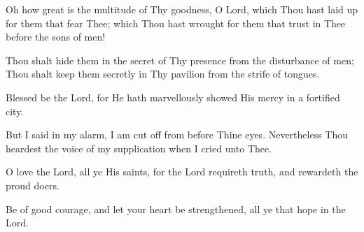 Oh how great is the multitude of Thy goodness, O Lord, which Thou hast laid up for them that fear Thee; which Thou hast wrought for them that trust in Thee before the sons of men!

Thou shalt hide them in the secret of Thy presence from the disturbance of men; Thou shalt keep them secretly in Thy pavilion from the strife of tongues.

Blessed be the Lord, for He hath marvellously showed His mercy in a fortified city.

But I said in my alarm, I am cut off from before Thine eyes. Nevertheless Thou heardest the voice of my supplication when I cried unto Thee.

O love the Lord, all ye His saints, for the Lord requireth truth, and rewardeth the proud doers.

Be of good courage, and let your heart be strengthened, all ye that hope in the Lord.

